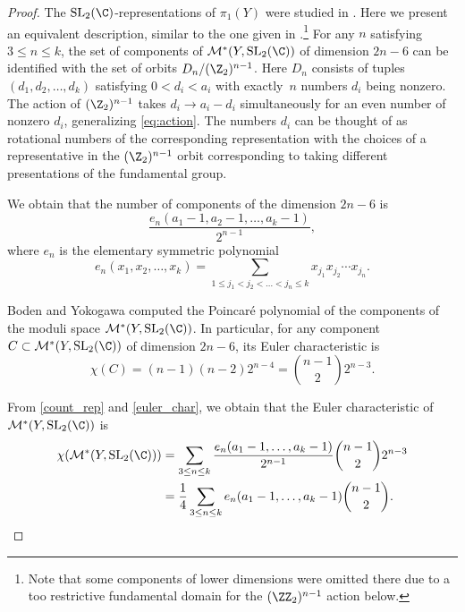 \documentclass[10pt,a4paper]{amsart}
\begin{document}
\begin{proof}

The $\operatorname{SL}_2(\C)$-representations of $\pi_1(Y)$ were studied in \cite[proof of Theorem 2.7]{BC06}. Here we present an equivalent description, similar to the one given in \cite{AM22}.\footnote{Note that some components of lower dimensions were omitted there due to a too restrictive fundamental domain for the $(\ZZ_2)^{n-1}$ action below.}
For any $n$ satisfying~${3 \leq n \leq k}$, the set of components of $\mathcal{M}^*(Y, \operatorname{SL}_2(\C))$ of dimension $2n-6$ can be identified with the set of orbits
$
D_n/(\Z_2)^{n-1}$.
Here $D_n$ consists of tuples $(d_1, d_2, \dots, d_k)$ satisfying $0<d_i<a_i$ with exactly~$n$ numbers $d_i$ being nonzero. The action of $(\Z_2)^{n-1}$ takes $d_i \rightarrow a_i - d_i$ simultaneously for an even number of nonzero $d_i$, generalizing \eqref{eq:action}. The numbers $d_i$ can be thought of as rotational numbers of the corresponding representation with the choices of a representative in the $(\Z_2)^{n-1}$ orbit corresponding to taking different presentations of the fundamental group.

We obtain that the number of components of the dimension $2n-6$ is
\begin{equation}\label{count_rep}
	\frac{e_n(a_1-1, a_2-1, \dots, a_k-1)}{2^{n-1}},
\end{equation}
where $e_n$ is the elementary symmetric polynomial
\[
	e_n(x_1, x_2, \dots, x_k) = \sum_{1\leq j_1 < j_2 <\dots <j_n \leq k} x_{j_1}x_{j_2}\cdots x_{j_n}.
\]

Boden and Yokogawa \cite{BoYo96} computed the Poincar\'e polynomial of the components of the moduli space $\mathcal{M}^*(Y, \operatorname{SL}_2(\C))$. In particular, for any component $C \subset \mathcal{M}^*(Y, \operatorname{SL}_2(\C))$ of dimension $2n-6$, its Euler characteristic is
\begin{equation}\label{euler_char}
	\chi(C) = (n-1)(n-2)2^{n-4} = \binom{n-1}{2}2^{n-3}.
\end{equation}

From \eqref{count_rep} and \eqref{euler_char}, we obtain that the Euler characteristic of $\mathcal{M}^*(Y, \operatorname{SL}_2(\C))$ is
\begin{align}
\chi(\mathcal{M}^*(Y, \operatorname{SL}_2(\C))) &=
 \sum_{3 \leq n \leq k } \frac{e_n(a_1-1, \dots, a_k-1)}{2^{n-1}} \binom{n-1}{2}2^{n-3}\nonumber \\
 &= \frac14 \sum_{3 \leq n \leq k } e_n(a_1-1, \dots, a_k-1) \binom{n-1}{2}.\label{eq:euler_char_moduli}
\end{align}


\end{proof}
\end{document}
